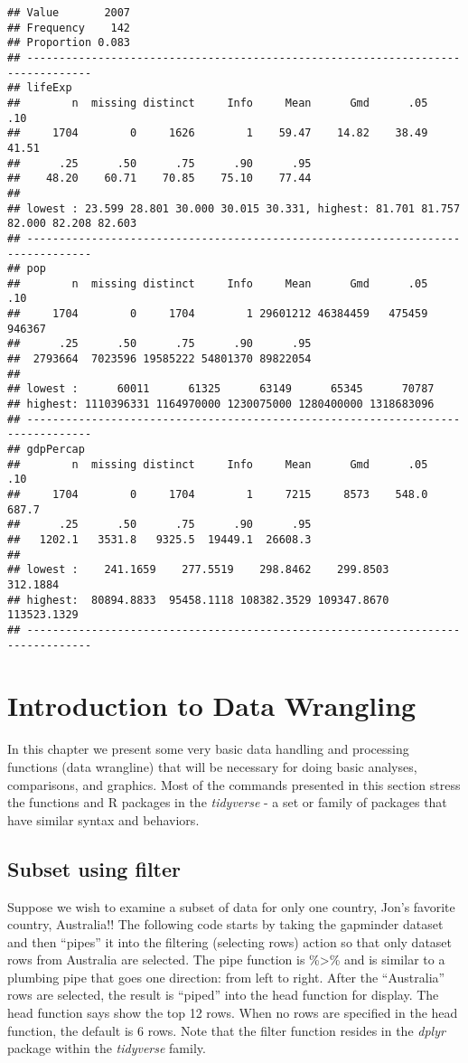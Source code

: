 \documentclass[]{book}
\begin{document}
\begin{verbatim}
## Value       2007
## Frequency    142
## Proportion 0.083
## --------------------------------------------------------------------------------
## lifeExp 
##        n  missing distinct     Info     Mean      Gmd      .05      .10 
##     1704        0     1626        1    59.47    14.82    38.49    41.51 
##      .25      .50      .75      .90      .95 
##    48.20    60.71    70.85    75.10    77.44 
## 
## lowest : 23.599 28.801 30.000 30.015 30.331, highest: 81.701 81.757 82.000 82.208 82.603
## --------------------------------------------------------------------------------
## pop 
##        n  missing distinct     Info     Mean      Gmd      .05      .10 
##     1704        0     1704        1 29601212 46384459   475459   946367 
##      .25      .50      .75      .90      .95 
##  2793664  7023596 19585222 54801370 89822054 
## 
## lowest :      60011      61325      63149      65345      70787
## highest: 1110396331 1164970000 1230075000 1280400000 1318683096
## --------------------------------------------------------------------------------
## gdpPercap 
##        n  missing distinct     Info     Mean      Gmd      .05      .10 
##     1704        0     1704        1     7215     8573    548.0    687.7 
##      .25      .50      .75      .90      .95 
##   1202.1   3531.8   9325.5  19449.1  26608.3 
## 
## lowest :    241.1659    277.5519    298.8462    299.8503    312.1884
## highest:  80894.8833  95458.1118 108382.3529 109347.8670 113523.1329
## --------------------------------------------------------------------------------
\end{verbatim}

\chapter{Introduction to Data Wrangling}\label{IntroDataWrangling}

In this chapter we present some very basic data handling and processing
functions (data wrangline) that will be necessary for doing basic
analyses, comparisons, and graphics. Most of the commands presented in
this section stress the functions and R packages in the \emph{tidyverse}
- a set or family of packages that have similar syntax and behaviors.

\section{Subset using filter}\label{subset-using-filter}

Suppose we wish to examine a subset of data for only one country, Jon's
favorite country, Australia!! The following code starts by taking the
gapminder dataset and then ``pipes'' it into the filtering (selecting
rows) action so that only dataset rows from Australia are selected. The
pipe function is \%\textgreater{}\% and is similar to a plumbing pipe
that goes one direction: from left to right. After the ``Australia''
rows are selected, the result is ``piped'' into the head function for
display. The head function says show the top 12 rows. When no rows are
specified in the head function, the default is 6 rows. Note that the
filter function resides in the \emph{dplyr} package within the
\emph{tidyverse} family.
\end{document}
